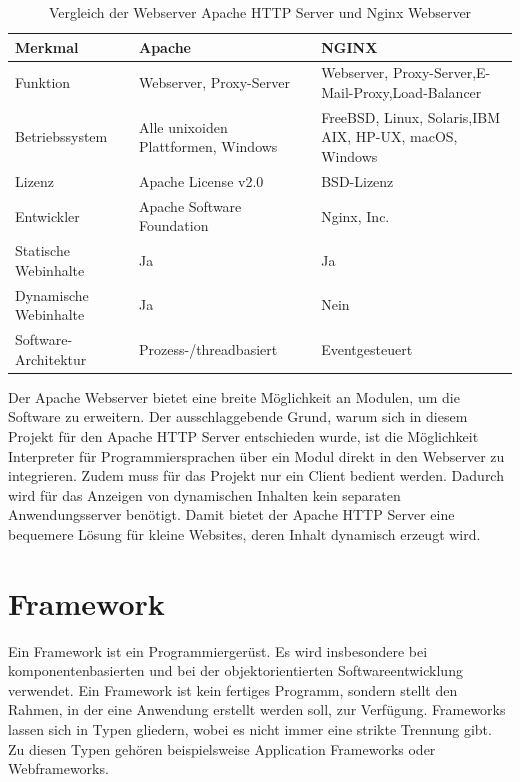 \newlength{\colWidth}
\setlength{\colWidth}{0.33\textwidth}
\begin{table}[htbp]
	\centering
	\begin{tabular}{p{\colWidth}p{\colWidth} p{\colWidth}}
		\hline
		Merkmal & Apache & NGINX \\
		\hline
		Funktion & Webserver, Proxy-Server & Webserver, Proxy-Server,\newline E-Mail-Proxy,\newline Load-Balancer \\
		Betriebssystem & Alle unixoiden Plattformen, Windows & FreeBSD, Linux, Solaris,\newline IBM AIX, HP-UX, \newline macOS, Windows \\
		Lizenz & Apache License v2.0 & \acs{BSD}-Lizenz \\
		Entwickler & Apache Software Foundation & Nginx, Inc. \\
		Statische Webinhalte & Ja & Ja \\
		Dynamische Webinhalte & Ja & Nein \\
		Software-Architektur & Prozess-/threadbasiert & Eventgesteuert \\
		\hline
	\end{tabular}
	\caption[Tabelle]{Vergleich der Webserver Apache HTTP Server und Nginx Webserver}
	\label{tab:ServerVergleich}
\end{table}

Der Apache Webserver bietet eine breite Möglichkeit an Modulen, um die Software zu erweitern.
Der ausschlaggebende Grund, warum sich in diesem Projekt für den Apache HTTP Server entschieden wurde, ist die Möglichkeit Interpreter für Programmiersprachen über ein Modul direkt in den Webserver zu integrieren. Zudem muss für das Projekt nur ein Client bedient werden. Dadurch wird für das Anzeigen von dynamischen Inhalten kein separaten  Anwendungsserver benötigt. Damit bietet der Apache HTTP Server eine bequemere Lösung für kleine Websites, deren Inhalt dynamisch erzeugt wird.


\section{Framework}
Ein Framework ist ein Programmiergerüst. Es wird insbesondere bei komponentenbasierten und bei der objektorientierten Softwareentwicklung verwendet. Ein Framework ist kein fertiges Programm, sondern stellt den Rahmen, in der eine Anwendung erstellt werden soll, zur Verfügung. Frameworks lassen sich in Typen gliedern, wobei es nicht immer eine strikte Trennung gibt. Zu diesen Typen gehören beispielsweise  Application Frameworks oder Webframeworks.

